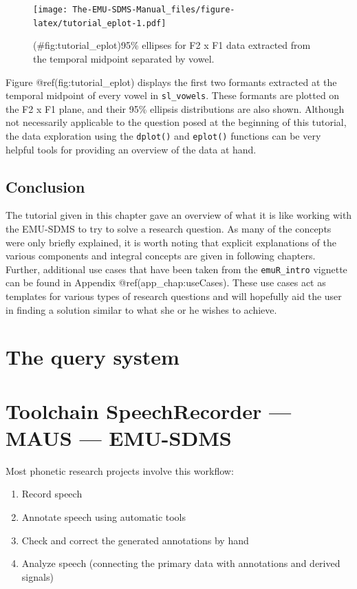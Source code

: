 \documentclass[]{book}
\providecommand{\tightlist}{%
  \setlength{\itemsep}{0pt}\setlength{\parskip}{0pt}}
\theoremstyle{definition}
\theoremstyle{definition}
\theoremstyle{definition}
\theoremstyle{remark}
\begin{document}
\begin{figure}
\centering
\texttt{[image: The-EMU-SDMS-Manual\_files/figure-latex/tutorial\_eplot-1.pdf]}
\caption{(\#fig:tutorial\_eplot)95\% ellipses for F2 x F1 data extracted
from the temporal midpoint separated by vowel.}
\end{figure}

Figure @ref(fig:tutorial\_eplot) displays the first two formants
extracted at the temporal midpoint of every vowel in
\texttt{sl\_vowels}. These formants are plotted on the F2 x F1 plane,
and their 95\% ellipsis distributions are also shown. Although not
necessarily applicable to the question posed at the beginning of this
tutorial, the data exploration using the \texttt{dplot()} and
\texttt{eplot()} functions can be very helpful tools for providing an
overview of the data at hand.

\section{Conclusion}\label{conclusion}

The tutorial given in this chapter gave an overview of what it is like
working with the EMU-SDMS to try to solve a research question. As many
of the concepts were only briefly explained, it is worth noting that
explicit explanations of the various components and integral concepts
are given in following chapters. Further, additional use cases that have
been taken from the \texttt{emuR\_intro} vignette can be found in
Appendix @ref(app\_chap:useCases). These use cases act as templates for
various types of research questions and will hopefully aid the user in
finding a solution similar to what she or he wishes to achieve.

\chapter{The query system}\label{the-query-system}

\chapter{Toolchain SpeechRecorder --- MAUS ---
EMU-SDMS}\label{toolchain-speechrecorder-maus-emu-sdms}

Most phonetic research projects involve this workflow:

\begin{enumerate}
\def\labelenumi{\arabic{enumi}.}
\tightlist
\item
  Record speech
\item
  Annotate speech using automatic tools
\item
  Check and correct the generated annotations by hand
\item
  Analyze speech (connecting the primary data with annotations and
  derived signals)
\end{enumerate}
\end{document}

